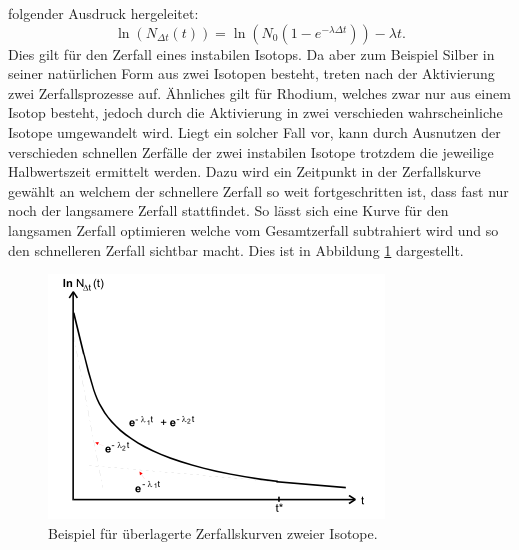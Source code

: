 folgender Ausdruck hergeleitet:
\begin{equation}
  \ln(N_{\Delta t}(t)) =\ln(N_0 (1-e^{- \lambda \Delta t})) - \lambda t  .
  \label{eqn:Zerfallskonstante}
\end{equation}
Dies gilt für den Zerfall eines instabilen Isotops. Da aber zum Beispiel Silber in seiner natürlichen Form aus zwei Isotopen besteht, treten nach der Aktivierung zwei Zerfallsprozesse
auf. Ähnliches gilt für Rhodium, welches zwar nur aus einem Isotop besteht, jedoch durch die Aktivierung in zwei verschieden wahrscheinliche Isotope umgewandelt wird.
Liegt ein solcher Fall vor, kann durch Ausnutzen der verschieden schnellen Zerfälle der zwei instabilen Isotope trotzdem die jeweilige Halbwertszeit ermittelt werden. Dazu wird ein Zeitpunkt
in der Zerfallskurve gewählt an welchem der schnellere Zerfall so weit fortgeschritten ist, dass fast nur noch der langsamere Zerfall stattfindet. So lässt sich eine Kurve für den
langsamen Zerfall optimieren welche vom Gesamtzerfall subtrahiert wird und so den schnelleren Zerfall sichtbar macht. Dies ist in Abbildung \ref{fig:2Isotope} dargestellt.
\FloatBarrier
\begin{figure}
  \centering
  \includegraphics{images/2Isotope.png}
  \caption{Beispiel für überlagerte Zerfallskurven zweier Isotope.\cite{sample}}
  \label{fig:2Isotope}
\end{figure}
\FloatBarrier

